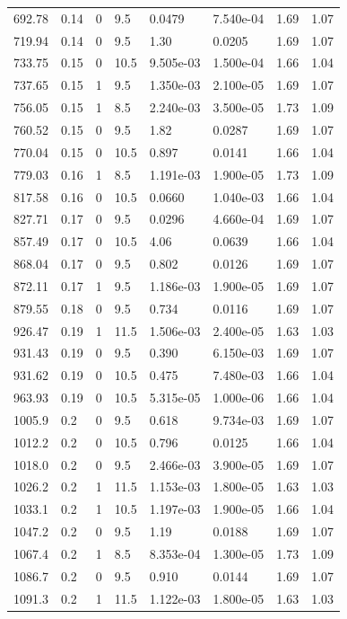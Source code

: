 \documentclass[preview]{standalone}
\begin{document}
{{{\begin{tabular}{L{1.2cm}C{1.2cm} C{0.3cm}C{0.5cm} C{1.4cm}C{1.4cm} C{1.4cm}C{1.4cm}}
  692.78  &  0.14  & 0     & 9.5 &  0.0479  & 7.540e-04  & 1.69 &  1.07   \\ 
  719.94  &  0.14  & 0     & 9.5 &  1.30  & 0.0205  & 1.69 &  1.07   \\ 
  733.75  &  0.15  & 0     & 10.5 &  9.505e-03  & 1.500e-04  & 1.66 &  1.04   \\ 
  737.65  &  0.15  & 1     & 9.5 &  1.350e-03  & 2.100e-05  & 1.69 &  1.07   \\ 
  756.05  &  0.15  & 1     & 8.5 &  2.240e-03  & 3.500e-05  & 1.73 &  1.09   \\ 
  760.52  &  0.15  & 0     & 9.5 &  1.82  & 0.0287  & 1.69 &  1.07   \\ 
  770.04  &  0.15  & 0     & 10.5 &  0.897  & 0.0141  & 1.66 &  1.04   \\ 
  779.03  &  0.16  & 1     & 8.5 &  1.191e-03  & 1.900e-05  & 1.73 &  1.09   \\ 
  817.58  &  0.16  & 0     & 10.5 &  0.0660  & 1.040e-03  & 1.66 &  1.04   \\ 
  827.71  &  0.17  & 0     & 9.5 &  0.0296  & 4.660e-04  & 1.69 &  1.07   \\ 
  857.49  &  0.17  & 0     & 10.5 &  4.06  & 0.0639  & 1.66 &  1.04   \\ 
  868.04  &  0.17  & 0     & 9.5 &  0.802  & 0.0126  & 1.69 &  1.07   \\ 
  872.11  &  0.17  & 1     & 9.5 &  1.186e-03  & 1.900e-05  & 1.69 &  1.07   \\ 
  879.55  &  0.18  & 0     & 9.5 &  0.734  & 0.0116  & 1.69 &  1.07   \\ 
  926.47  &  0.19  & 1     & 11.5 &  1.506e-03  & 2.400e-05  & 1.63 &  1.03   \\ 
  931.43  &  0.19  & 0     & 9.5 &  0.390  & 6.150e-03  & 1.69 &  1.07   \\ 
  931.62  &  0.19  & 0     & 10.5 &  0.475  & 7.480e-03  & 1.66 &  1.04   \\ 
  963.93  &  0.19  & 0     & 10.5 &  5.315e-05  & 1.000e-06  & 1.66 &  1.04   \\ 
  1005.9  &   0.2  & 0     & 9.5 &  0.618  & 9.734e-03  & 1.69 &  1.07   \\ 
  1012.2  &   0.2  & 0     & 10.5 &  0.796  & 0.0125  & 1.66 &  1.04   \\ 
  1018.0  &   0.2  & 0     & 9.5 &  2.466e-03  & 3.900e-05  & 1.69 &  1.07   \\ 
  1026.2  &   0.2  & 1     & 11.5 &  1.153e-03  & 1.800e-05  & 1.63 &  1.03   \\ 
  1033.1  &   0.2  & 1     & 10.5 &  1.197e-03  & 1.900e-05  & 1.66 &  1.04   \\ 
  1047.2  &   0.2  & 0     & 9.5 &  1.19  & 0.0188  & 1.69 &  1.07   \\ 
  1067.4  &   0.2  & 1     & 8.5 &  8.353e-04  & 1.300e-05  & 1.73 &  1.09   \\ 
  1086.7  &   0.2  & 0     & 9.5 &  0.910  & 0.0144  & 1.69 &  1.07   \\ 
  1091.3  &   0.2  & 1     & 11.5 &  1.122e-03  & 1.800e-05  & 1.63 &  1.03   \\ 
\hline 
\end{tabular} 

}}}
\end{document}
